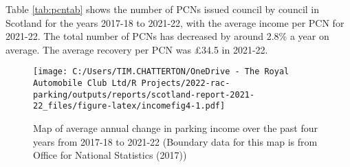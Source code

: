 \documentclass[
  12pt,
]{article}
\begin{document}
Table \ref{tab:pcntab} shows the number of PCNs issued council by council in Scotland for the years 2017-18 to 2021-22, with the average income per PCN for 2021-22. The total number of PCNs has decreased by around 2.8\% a year on average. The average recovery per PCN was £34.5 in 2021-22.

\begin{figure}
\centering
\texttt{[image: C:/Users/TIM.CHATTERTON/OneDrive - The Royal Automobile Club Ltd/R Projects/2022-rac-parking/outputs/reports/scotland-report-2021-22\_files/figure-latex/incomefig4-1.pdf]}
\caption{\label{fig:incomefig4}Map of average annual change in parking income over the past four years from 2017-18 to 2021-22 (Boundary data for this map is from Office for National Statistics (2017))}
\end{figure}

\newpage

\pagebreak

\begingroup\fontsize{10}{12}\selectfont
\end{document}
